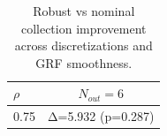 \begin{table}[h]
\centering
\small
\begin{tabular}{l|c}
\toprule
$\rho$ & $N_{out}=6$ \\ \midrule
0.75 & Δ=5.932 (p=0.287) \\
\bottomrule
\end{tabular}
\caption{Robust vs nominal collection improvement across discretizations and GRF smoothness.}
\label{tab:collection_sweep}
\end{table}